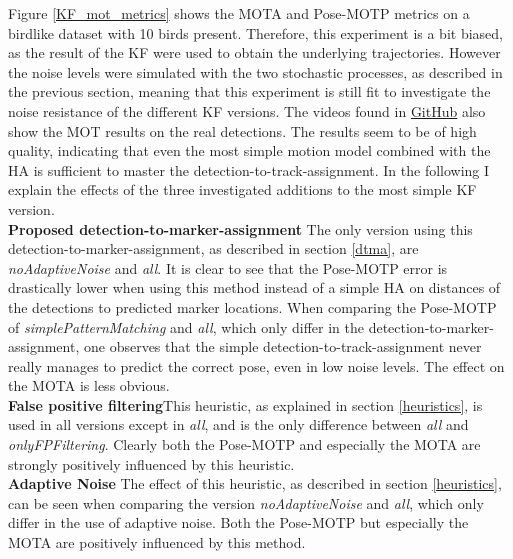 \documentclass[12pt,a4paper]{article}
\begin{document}
Figure \ref{KF_mot_metrics} shows the MOTA and Pose-MOTP metrics on a birdlike dataset with 10 birds present. Therefore, this experiment is a bit biased, as the result of the KF were used to obtain the underlying trajectories. However the noise levels were simulated with the two stochastic processes, as described in the previous section, meaning that this experiment is still fit to investigate the noise resistance of the different KF versions. The videos found in \href{https://github.com/SimonGiebenhain/tracking}{GitHub} also show the MOT results on the real detections. The results seem to be of high quality, indicating that even the most simple motion model combined with the HA is sufficient to master the detection-to-track-assignment. In the following I explain the effects of the three investigated additions to the most simple KF version.\\ 

\textbf{Proposed detection-to-marker-assignment}  \space \space\space  The only version using this detection-to-marker-assignment, as described in section \ref{dtma}, are \emph{noAdaptiveNoise} and \emph{all}. It is clear to see that the Pose-MOTP error is drastically lower when using this method instead of a simple HA on distances of the detections to predicted marker locations. When comparing the Pose-MOTP of \emph{simplePatternMatching} and \emph{all}, which only differ in the detection-to-marker-assignment, one observes that the simple detection-to-track-assignment never really manages to predict the correct pose, even in low noise levels. The effect on the MOTA is less obvious. \\

\textbf{False positive filtering}\space \space\space This heuristic, as explained in section \ref{heuristics}, is used in all versions except in \emph{all}, and is the only difference between \emph{all} and \emph{onlyFPFiltering}. Clearly both the Pose-MOTP and especially the MOTA are strongly positively influenced by this heuristic.\\

\textbf{Adaptive Noise} \space \space\space The effect of this heuristic, as described in section \ref{heuristics}, can be seen when comparing the version \emph{noAdaptiveNoise} and \emph{all}, which only differ in the use of adaptive noise. Both the Pose-MOTP but especially the MOTA are positively influenced by this method.
\end{document}
